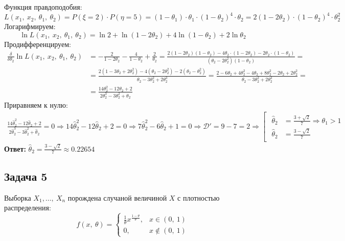 \documentclass[12pt, a4paper]{article}
\begin{document}
Функция правдоподобия:
\begin{equation*}
    L(x_1,\ x_2,\ \theta_1,\ \theta_2) = P(\xi = 2)\cdot P(\eta = 5) = (1 - \theta_1)\cdot \theta_1 \cdot (1 - \theta_2)^4 \cdot \theta_2 = 2(1 - 2\theta_2)\cdot(1 - \theta_2)^4\cdot\theta_2^2
\end{equation*}
Логарифмируем:
\begin{equation*}
    \ln L(x_1,\ x_2,\ \theta_1,\ \theta_2) = \ln 2 + \ln(1 - 2\theta_2) + 4\ln(1 - \theta_2) + 2\ln \theta_2
\end{equation*}
Продифференцируем:
\begin{equation*}
    \begin{aligned}
        \frac{\delta}{\delta \theta_2} \ln L(x_1,\ x_2,\ \theta_1,\ \theta_2) &= -\frac{2}{1 - 2\theta_2} - \frac{4}{1 - \theta_2} + \frac{2}{\theta_2} = \frac{2(1 - 2\theta_2)(1 - \theta_2) - 4\theta_2 \cdot(1 - 2\theta_2)  -2\theta_2\cdot(1 - \theta_2)}{(\theta_2 - 2\theta^2_2)(1 - \theta_2)} = \\
        &= \frac{2(1 - 3\theta_2 + 2\theta_2^2) - 4(\theta_2 - 2\theta_2^2) - 2(\theta_2 - \theta_2^2)}{\theta_2 - 3\theta_2^2 + 2\theta_2^3} = \frac{2 - 6\theta_2 + 4\theta_2^2 - 4\theta_2 + 8\theta_2^2 - 2\theta_2 + 2\theta_2^2}{\theta_2 - 3\theta_2^2 + 2\theta_2^3} =\\
        &= \frac{14\theta_2^2 - 12\theta_2 + 2}{2\theta_2^3 - 3\theta_2^2 + \theta_2}
    \end{aligned}
\end{equation*}
Приравняем к нулю:
\begin{equation*}
    \begin{aligned}
        \frac{14\hat\theta_2^2 - 12\hat\theta_2 + 2}{2\hat\theta_2^3 - 3\hat\theta_2^2 + \hat\theta_2} = 0 \Rightarrow {14\hat\theta_2^2 - 12\hat\theta_2 + 2} = 0 \Rightarrow 7\hat\theta_2^2 - 6\hat\theta_2 + 1 = 0 \Rightarrow \mathcal{D}' = 9 - 7 = 2\Rightarrow \left[\begin{gathered}
            \begin{aligned}
                \hat\theta_2 &= \frac{3 + \sqrt{2}}{7} \Rightarrow \theta_1 > 1\\
                \hat\theta_2 &= \frac{3 - \sqrt{2}}{7}
            \end{aligned}
        \end{gathered}\right.
    \end{aligned}
\end{equation*}
\textbf{Ответ:} $\hat \theta_2 = \frac{3 - \sqrt{2}}{7} \approx 0.22654$
\subsection*{Задача 5}
Выборка $X_1,\dots,\ X_n$ порождена случаной величиной $X$ с плотностью распределения:
\[f(x,\ \theta) = \begin{cases}
    \frac{1}{\theta}x^{\frac{1 - \theta}{\theta}}, & x\in (0,\ 1)\\
    0,\ & x\notin (0,\ 1)
\end{cases}\]
\end{document}
